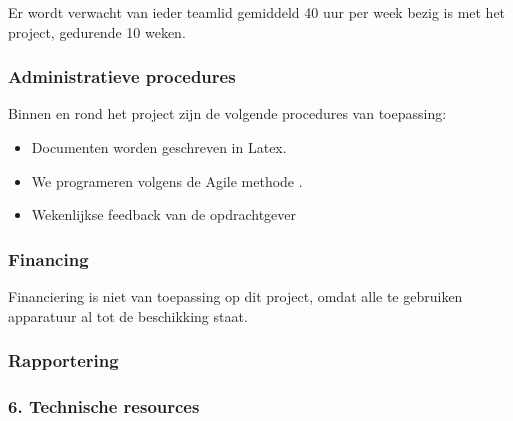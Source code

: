 Er wordt verwacht van ieder teamlid gemiddeld 40 uur per week bezig is met het project, gedurende 10 weken.

\subsubsection{Administratieve procedures}

Binnen en rond het project zijn de volgende procedures van toepassing:

\begin{itemize}
    \item Documenten worden geschreven in Latex.
    \item We programeren volgens de Agile methode \cite{wiki:agile}.
    \item Wekenlijkse feedback van de opdrachtgever
\end{itemize}

\subsubsection{Financing}

Financiering is niet van toepassing op dit project, omdat alle te gebruiken apparatuur al tot de beschikking staat.

\subsubsection{Rapportering}

\subsubsection{6.	Technische resources}

